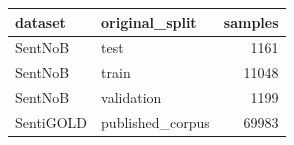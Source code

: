 \begin{tabular}{llr}
\toprule
dataset & original\_split & samples \\
\midrule
SentNoB & test & 1161 \\
SentNoB & train & 11048 \\
SentNoB & validation & 1199 \\
SentiGOLD & published\_corpus & 69983 \\
\bottomrule
\end{tabular}
